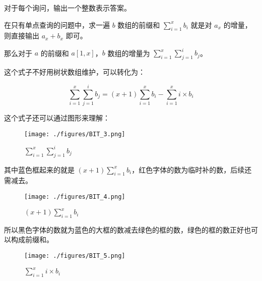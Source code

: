 对于每个询问，输出一个整数表示答案。

在只有单点查询的问题中，求一遍 $b$ 数组的前缀和 $\sum\limits^x_{i=1}b_i$ 就是对 $a_x$ 的增量，则直接输出 $a_x + b_x$ 即可。

那么对于 $a$ 的前缀和 $a[1, x]$，$b$ 数组的增量为 $\sum\limits^x_{i=1}\sum\limits^i_{j=1}b_j$。

这个式子不好用树状数组维护，可以转化为：

\begin{equation}
\sum\limits^x_{i=1}\sum\limits^i_{j=1}b_j = (x + 1)\sum\limits^x_{i=1}b_i - \sum\limits^x_{i=1}i \times b_i
\end{equation}

这个式子还可以通过图形来理解：

\begin{figure}[ht]
\centering
\texttt{[image: ./figures/BIT\_3.png]}
\caption{$\sum\limits^x_{i=1}\sum\limits^i_{j=1}b_j$} \label{BIT_fig3}
\end{figure}


其中蓝色框起来的就是 $(x + 1)\sum\limits^x_{i=1}b_i$，红色字体的数为临时补的数，后续还需减去。

\begin{figure}[ht]
\centering
\texttt{[image: ./figures/BIT\_4.png]}
\caption{$(x + 1)\sum\limits^x_{i=1}b_i$} \label{BIT_fig4}
\end{figure}

所以黑色字体的数就为蓝色的大框的数减去绿色的框的数，绿色的框的数正好也可以构成前缀和。

\begin{figure}[ht]
\centering
\texttt{[image: ./figures/BIT\_5.png]}
\caption{$\sum\limits^x_{i=1}i \times b_i$} \label{BIT_fig5}
\end{figure}

